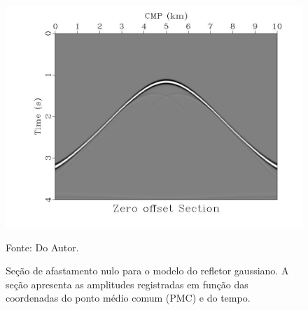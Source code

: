 \begin{figure}[htb]
\caption{Seção de afastamento nulo para o modelo do refletor gaussiano.
A seção apresenta as amplitudes registradas em função das coordenadas do
ponto médio comum (PMC) e do tempo.}
\begin{center}
\includegraphics[scale=0.3]{images/zeroOffset.jpeg}
\vspace{-0.3cm}
\end{center}
\begin{center}
 Fonte: Do Autor.
\end{center}
\label{fig:5.4}
\end{figure}
